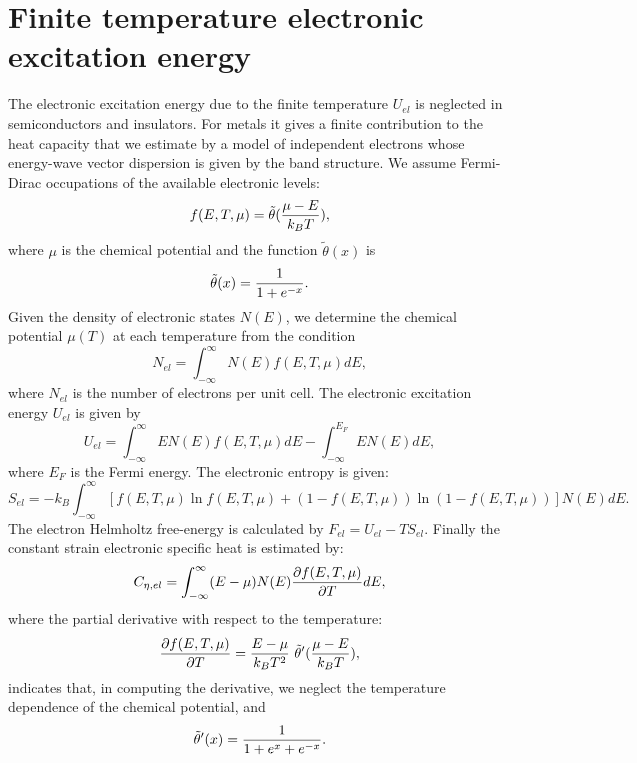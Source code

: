 \documentclass[12pt,a4paper,twoside]{report}
\begin{document}
\newpage

{\color{dark-blue}\chapter{Finite temperature electronic excitation energy}}
\color{black}

The electronic excitation energy due to the finite temperature $U_{el}$ is
neglected in semiconductors and insulators. For metals it gives a finite
contribution to the heat capacity that we estimate by a model of independent 
electrons whose energy-wave vector dispersion is given by the band structure. 
We assume Fermi-Dirac occupations of the available electronic levels:
\begin{equation}
f(E,T,\mu) = \tilde \theta({\mu - E \over k_B T}),
\end{equation}
where $\mu$ is the chemical potential and the function $\tilde \theta(x)$ is
\begin{equation}
\tilde \theta(x) = {1 \over 1 + e^{-x}}.
\end{equation}
Given the density of electronic states $N(E)$,
we determine the chemical potential $\mu(T)$ at each temperature
from the condition
\begin{equation}
N_{el} = \int_{-\infty}^\infty N(E) f(E,T,\mu) dE,
\end{equation}
where $N_{el}$ is the number of electrons per unit cell.
The electronic excitation energy $U_{el}$ is given by
\begin{equation}
U_{el}=\int_{-\infty}^\infty E N(E) f(E,T,\mu) dE - 
\int_{-\infty}^{E_F} E N(E) dE,
\end{equation}
where $E_F$ is the Fermi energy.
The electronic entropy is given:
\begin{equation}
S_{el}=-k_B\int_{-\infty}^\infty \left[ f(E,T,\mu) \ln f(E,T,\mu) 
+ (1 - f(E,T,\mu)) \ln (1 - f(E,T,\mu)) \right] N(E) dE.
\end{equation}
The electron Helmholtz free-energy is calculated by 
$F_{el}=U_{el}-TS_{el}$.
Finally the constant strain electronic specific heat is estimated by:
\begin{equation}
C_{\eta,el}=\int_{-\infty}^\infty (E - \mu) N(E) 
{\partial f(E,T,\mu) \over \partial T} dE,  
\end{equation}
where the partial derivative with respect to the temperature:
\begin{equation}
{\partial f(E,T,\mu) \over \partial T} = {E -\mu \over k_B T^2} \ \tilde 
\theta'({\mu - E \over k_B T}),
\end{equation}
indicates that, in computing the derivative, we neglect the temperature 
dependence of the chemical potential, and
\begin{equation}
\tilde \theta'(x) = {1 \over 1 + e^x+ e^{-x}}.
\end{equation}
\end{document}
